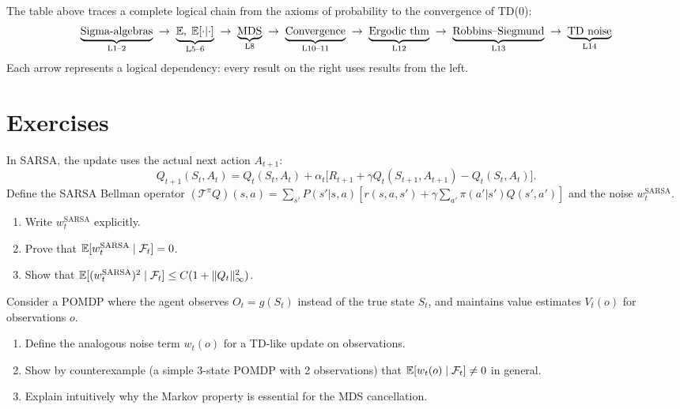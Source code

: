 \documentclass[11pt,a4paper]{article}
\begin{document}
\begin{rlconnection}[title={The Complete Pipeline}]
The table above traces a complete logical chain from
the axioms of probability to the convergence of TD(0):
\[
  \underbrace{\text{Sigma-algebras}}_{\text{L1--2}}
  \;\to\;
  \underbrace{\mathbb{E},\; \mathbb{E}[\cdot|\cdot]}_{\text{L5--6}}
  \;\to\;
  \underbrace{\text{MDS}}_{\text{L8}}
  \;\to\;
  \underbrace{\text{Convergence}}_{\text{L10--11}}
  \;\to\;
  \underbrace{\text{Ergodic thm}}_{\text{L12}}
  \;\to\;
  \underbrace{\text{Robbins--Siegmund}}_{\text{L13}}
  \;\to\;
  \underbrace{\text{TD noise}}_{\text{L14}}
\]
Each arrow represents a logical dependency: every result on
the right uses results from the left.
\end{rlconnection}


\section{Exercises}
\label{sec:exercises}

\begin{exercise}
\label{ex:sarsa}
In SARSA, the update uses the actual next action $A_{t+1}$:
\[
  Q_{t+1}(S_t, A_t)
  = Q_t(S_t, A_t) + \alpha_t
    \bigl[R_{t+1} + \gamma Q_t(S_{t+1}, A_{t+1})
    - Q_t(S_t, A_t)\bigr].
\]
Define the SARSA Bellman operator
$(\mathcal{T}^\pi Q)(s,a) = \sum_{s'} P(s'|s,a)
[r(s,a,s') + \gamma \sum_{a'} \pi(a'|s') Q(s',a')]$ and
the noise $w_t^{\text{SARSA}}$.
\begin{enumerate}[label=(\alph*)]
  \item Write $w_t^{\text{SARSA}}$ explicitly.
  \item Prove that
    $\mathbb{E}[w_t^{\text{SARSA}} \mid \mathcal{F}_t] = 0$.
  \item Show that
    $\mathbb{E}[(w_t^{\text{SARSA}})^2 \mid \mathcal{F}_t]
    \leq C(1 + \|Q_t\|_\infty^2)$.
\end{enumerate}
\end{exercise}

\begin{exercise}
\label{ex:non_markov}
Consider a POMDP where the agent observes $O_t = g(S_t)$
instead of the true state $S_t$, and maintains value
estimates $V_t(o)$ for observations $o$.
\begin{enumerate}[label=(\alph*)]
  \item Define the analogous noise term $w_t(o)$ for
    a TD-like update on observations.
  \item Show by counterexample (a simple 3-state POMDP
    with 2 observations) that
    $\mathbb{E}[w_t(o) \mid \mathcal{F}_t] \neq 0$ in general.
  \item Explain intuitively why the Markov property is
    essential for the MDS cancellation.
\end{enumerate}
\end{exercise}
\end{document}
